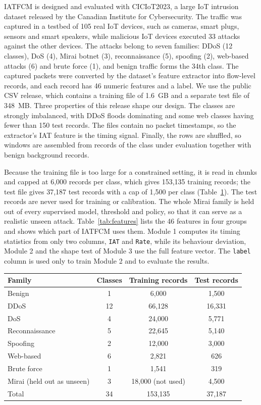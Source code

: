 \documentclass[]{interact}
\theoremstyle{plain}
\theoremstyle{definition}
\newcommand{\unhead}[1]{\par\vspace{8pt}\noindent{\normalsize\bfseries #1}\par\vspace{4pt}\noindent}
\begin{document}
\unhead{Dataset}
IATFCM is designed and evaluated with CICIoT2023\cite{neto2023ciciot2023}, a large IoT intrusion dataset released by the Canadian Institute for Cybersecurity. The traffic was captured in a testbed of 105 real IoT devices, such as cameras, smart plugs, sensors and smart speakers, while malicious IoT devices executed 33 attacks against the other devices. The attacks belong to seven families: DDoS (12 classes), DoS (4), Mirai botnet (3), reconnaissance (5), spoofing (2), web-based attacks (6) and brute force (1), and benign traffic forms the 34th class. The captured packets were converted by the dataset's feature extractor into flow-level records, and each record has 46 numeric features and a label. We use the public CSV release, which contains a training file of 1.6~GB and a separate test file of 348~MB. Three properties of this release shape our design. The classes are strongly imbalanced, with DDoS floods dominating and some web classes having fewer than 150 test records. The files contain no packet timestamps, so the extractor's IAT feature is the timing signal. Finally, the rows are shuffled, so windows are assembled from records of the class under evaluation together with benign background records.

Because the training file is too large for a constrained setting, it is read in chunks and capped at 6,000 records per class, which gives 153,135 training records; the test file gives 37,187 test records with a cap of 1,500 per class (Table~\ref{tab:dataset}). The test records are never used for training or calibration. The whole Mirai family is held out of every supervised model, threshold and policy, so that it can serve as a realistic unseen attack. Table~\ref{tab:features} lists the 46 features in four groups and shows which part of IATFCM uses them. Module 1 computes its timing statistics from only two columns, \texttt{IAT} and \texttt{Rate}, while its behaviour deviation, Module 2 and the shape test of Module 3 use the full feature vector. The \texttt{label} column is used only to train Module 2 and to evaluate the results.

\begin{table}[htbp]
{\small
\begin{tabular}{lccc}
\toprule
Family & Classes & Training records & Test records \\
\midrule
Benign       & 1  & 6,000  & 1,500 \\
DDoS         & 12 & 66,128 & 16,331 \\
DoS          & 4  & 24,000 & 5,771 \\
Reconnaissance & 5 & 22,645 & 5,140 \\
Spoofing     & 2  & 12,000 & 3,000 \\
Web-based    & 6  & 2,821  & 626 \\
Brute force  & 1  & 1,541  & 319 \\
Mirai (held out as unseen) & 3 & 18,000 (not used) & 4,500 \\
\midrule
Total        & 34 & 153,135 & 37,187 \\
\bottomrule
\end{tabular}}
\label{tab:dataset}
\end{table}
\end{document}
